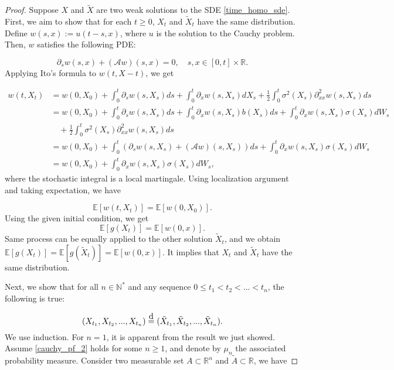 \documentclass{article}
\newcommand\eqd{\stackrel{\mathclap{\normalfont\mbox{d}}}{=}}
\begin{document}
\begin{proof}
Suppose $X$ and $\tilde{X}$ are two weak solutions to the SDE \eqref{time_homo_sde}. First, we aim to show that for each $t\geq0$, $X_t$ and $\tilde{X}_t$ have the same distribution. Define $w(s,x):=u(t-s,x)$, where $u$ is the solution to the Cauchy problem. Then, $w$ satisfies the following PDE:

\begin{equation} \label{cauchy_pf_1}
\partial_s w(s,x)+(\mathcal{A}w)(s,x)=0, \quad s,x\in[0,t]\times\mathbb{R}.
\end{equation}
Applying Ito's formula to $w(t,X-t)$, we get

\begin{equation*}
\begin{aligned}
w(t,X_t)&=w(0,X_0)+\int^t_0\partial_sw(s,X_s)ds + \int^t_0\partial_xw(s,X_s)dX_s+\frac{1}{2}\int^t_0\sigma^2(X_s)\partial^2_{xx}w(s,X_s)ds\\
&=w(0,X_0)+\int^t_0\partial_sw(s,X_s)ds + \int^t_0\partial_xw(s,X_s)b(X_s)ds+\int^t_0\partial_xw(s,X_s)\sigma(X_s)dW_s\\
&\quad+\frac{1}{2}\int^t_0\sigma^2(X_s)\partial^2_{xx}w(s,X_s)ds\\
&=w(0,X_0)+\int^t_0\left(\partial_sw(s,X_s) + (\mathcal{A}w)(s,X_s)\right)ds+\int^t_0\partial_xw(s,X_s)\sigma(X_s)dW_s\\
&=w(0,X_0)+\int^t_0\partial_xw(s,X_s)\sigma(X_s)dW_s,
\end{aligned}
\end{equation*}
where the stochastic integral is a local martingale. Using localization argument and taking expectation, we have

\begin{equation*}
\mathbb{E}[w(t,X_t)]=\mathbb{E}[w(0,X_0)].
\end{equation*}
Using the given initial condition, we get
\begin{equation*}
\mathbb{E}[g(X_t)]=\mathbb{E}[w(0,x)].
\end{equation*}
Same process can be equally applied to the other solution $\tilde{X}_t$, and we obtain $\mathbb{E}[g(X_t)]=\mathbb{E}[g(\tilde{X}_t)]=\mathbb{E}[w(0,x)]$. It implies that $X_t$ and $\tilde{X}_t$ have the same distribution.

Next, we show that for all $n\in\mathbb{N}^*$ and any sequence $0\leq t_1<t_2<...<t_n$, the following is true:

\begin{equation} \label{cauchy_pf_2}
(X_{t_1},X_{t_2},...,X_{t_n})\eqd(\tilde{X}_{t_1},\tilde{X}_{t_2},...,\tilde{X}_{t_n}).
\end{equation}
We use induction. For $n=1$, it is apparent from the result we just showed. Assume \eqref{cauchy_pf_2} holds for some $n\geq1$, and denote by $\mu_n$ the associated probability measure. Consider two measurable set $A\subset\mathbb{R}^n$ and $\tilde{A}\subset\mathbb{R}$, we have


\end{proof}
\end{document}
